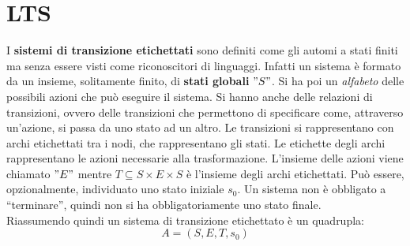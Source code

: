\section{LTS}
  I \textbf{sistemi di transizione etichettati} sono definiti come gli automi a
  stati finiti ma senza essere visti come riconoscitori di linguaggi. Infatti un
  sistema è formato da un insieme, solitamente finito, di \textbf{stati globali} $"S"$. Si
  ha poi un \textit{alfabeto} delle possibili azioni che può eseguire il
  sistema. Si hanno anche delle relazioni di transizioni, ovvero delle
  transizioni che permettono di specificare come, attraverso un'azione, si passa
  da uno stato ad un altro. Le transizioni si rappresentano con archi
  etichettati tra i nodi, che rappresentano 
  gli stati. Le etichette degli archi rappresentano le azioni necessarie alla
  trasformazione. L'insieme delle azioni viene chiamato $"E"$ mentre $T\subseteq
  S\times E\times S$ è l'insieme degli archi etichettati. Può essere,
  opzionalmente, individuato uno stato iniziale $s_0$. Un sistema non è
  obbligato a ``terminare'', quindi non si ha obbligatoriamente uno stato
  finale.\\ 
  Riassumendo quindi un sistema di transizione etichettato è un quadrupla:
  \[A=(S, E, T, s_0)\]
 
